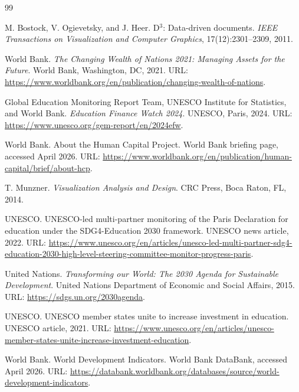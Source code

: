 \documentclass{vgtc}
\begin{document}
\begingroup
\sloppy
\begin{thebibliography}{99}\small

M. Bostock, V. Ogievetsky, and J. Heer.
\newblock D$^3$: Data-driven documents.
\newblock \emph{IEEE Transactions on Visualization and Computer Graphics}, 17(12):2301--2309, 2011.

World Bank.
\newblock \emph{The Changing Wealth of Nations 2021: Managing Assets for the Future}.
\newblock World Bank, Washington, DC, 2021.
\newblock URL: \url{https://www.worldbank.org/en/publication/changing-wealth-of-nations}.

Global Education Monitoring Report Team, UNESCO Institute for Statistics, and World Bank.
\newblock \emph{Education Finance Watch 2024}.
\newblock UNESCO, Paris, 2024.
\newblock URL: \url{https://www.unesco.org/gem-report/en/2024efw}.

World Bank.
\newblock About the Human Capital Project.
\newblock World Bank briefing page, accessed April 2026.
\newblock URL: \url{https://www.worldbank.org/en/publication/human-capital/brief/about-hcp}.

T. Munzner.
\newblock \emph{Visualization Analysis and Design}.
\newblock CRC Press, Boca Raton, FL, 2014.

UNESCO.
\newblock UNESCO-led multi-partner monitoring of the Paris Declaration for education under the SDG4-Education 2030 framework.
\newblock UNESCO news article, 2022.
\newblock URL: \url{https://www.unesco.org/en/articles/unesco-led-multi-partner-sdg4-education-2030-high-level-steering-committee-monitor-progress-paris}.

United Nations.
\newblock \emph{Transforming our World: The 2030 Agenda for Sustainable Development}.
\newblock United Nations Department of Economic and Social Affairs, 2015.
\newblock URL: \url{https://sdgs.un.org/2030agenda}.

UNESCO.
\newblock UNESCO member states unite to increase investment in education.
\newblock UNESCO article, 2021.
\newblock URL: \url{https://www.unesco.org/en/articles/unesco-member-states-unite-increase-investment-education}.

World Bank.
\newblock World Development Indicators.
\newblock World Bank DataBank, accessed April 2026.
\newblock URL: \url{https://databank.worldbank.org/databases/source/world-development-indicators}.

\end{thebibliography}
\endgroup
\appendix
\renewcommand{\thesection}{Appendix \Alph{section}:}
\end{document}
